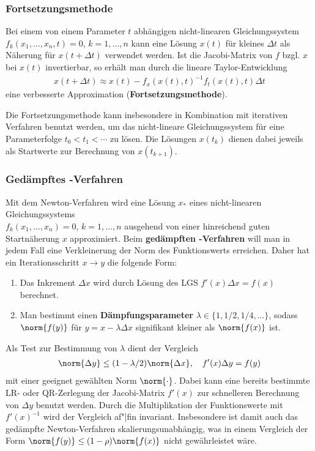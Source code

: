 \pagebreak

\subsubsection{%
    Fortsetzungsmethode%
}

Bei einem von einem Parameter $t$ abhängigen nicht-linearen Gleichungssystem \\
$f_k(x_1, \dotsc, x_n, t) = 0$, $k = 1, \dotsc, n$
kann eine Lösung $x(t)$ für kleines $\Delta t$ als Näherung für
$x(t + \Delta t)$ verwendet werden.
Ist die Jacobi-Matrix von $f$ bzgl. $x$ bei $x(t)$ invertierbar,
so erhält man durch die lineare Taylor-Entwicklung
\begin{align*}
    x(t + \Delta t) \approx x(t) - f_x(x(t), t)^{-1} f_t(x(t), t) \Delta t
\end{align*}
eine verbesserte Approximation (\textbf{Fortsetzungsmethode}).

Die Fortsetzungsmethode kann insbesondere in Kombination mit iterativen
Verfahren benutzt werden, um das nicht-lineare Gleichungssystem für eine
Parameterfolge $t_0 < t_1 < \dotsb$ zu lösen.
Die Lösungen $x(t_k)$ dienen dabei jeweils als Startwerte zur Berechnung
von $x(t_{k+1})$.

\subsubsection{%
    Gedämpftes -Verfahren%
}

Mit dem Newton-Verfahren wird eine Lösung $x_\ast$ eines nicht-linearen
Gleichungssystems \\
$f_k(x_1, \dotsc, x_n) = 0$, $k = 1, \dotsc, n$
ausgehend von einer hinreichend guten Startnäherung $x$ approximiert.
Beim \textbf{gedämpften -Verfahren} will man in jedem Fall eine
Verkleinerung der Norm des Funktionswerts erreichen.
Daher hat ein Iterationsschritt $x \rightarrow y$ die folgende Form:
\begin{enumerate}
    \item
    Das Inkrement $\Delta x$ wird durch Lösung des LGS
    $f'(x) \Delta x = f(x)$ berechnet.
    
    \item
    Man bestimmt einen \textbf{Dämpfungsparameter}
    $\lambda \in \{1, 1/2, 1/4, \dotsc\}$, sodass $\norm{f(y)}$
    für $y = x - \lambda \Delta x$ signifikant kleiner als $\norm{f(x)}$ ist.
\end{enumerate}

Als Test zur Bestimmung von $\lambda$ dient der Vergleich
\begin{align*}
    \norm{\Delta y} \le (1 - \lambda/2) \norm{\Delta x}, \quad
    f'(x) \Delta y = f(y)
\end{align*}
mit einer geeignet gewählten Norm $\norm{\cdot}$.
Dabei kann eine bereits bestimmte LR- oder QR-Zerlegung der Jacobi-Matrix
$f'(x)$ zur schnelleren Berechnung von $\Delta y$ benutzt werden.
Durch die Multiplikation der Funktionswerte mit $f'(x)^{-1}$ wird der Vergleich
af"|fin invariant.
Insbesondere ist damit auch das gedämpfte Newton-Verfahren
skalierungsunabhängig, was in einem Vergleich der Form
$\norm{f(y)} \le (1 - \rho) \norm{f(x)}$ nicht gewährleistet wäre.

